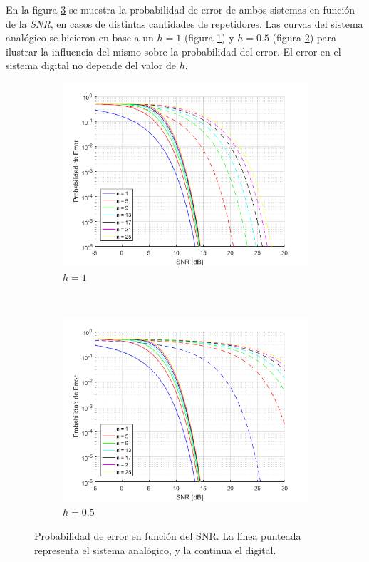 En la figura \ref{fig:prob_err} se muestra la probabilidad de error de ambos sistemas en función de la \textit{SNR}, en casos de distintas cantidades de repetidores. Las curvas del sistema analógico se hicieron en base a un $h=1$ (figura \ref{fig:prob_err_a}) y $h=0.5$ (figura \ref{fig:prob_err_b}) para ilustrar la influencia del mismo sobre la probabilidad del error. El error en el sistema digital no depende del valor de $h$.


\begin{figure}[]
    \centering
    \begin{subfigure}[t]{0.8\textwidth}
        \centering
        \includegraphics[width=\textwidth]{./Matlab/ej3h=1.png}
        \caption{$h=1$}
        \label{fig:prob_err_a}
    \end{subfigure}%
    \\
    \begin{subfigure}[t]{0.8\textwidth}
        \centering
        \includegraphics[width=\textwidth]{./Matlab/ej3h=05.png}
        \caption{$h=0.5$}
        \label{fig:prob_err_b}
    \end{subfigure}
    \caption{Probabilidad de error en función del SNR. La línea punteada representa el sistema analógico, y la continua el digital.}
\label{fig:prob_err}
\end{figure}

